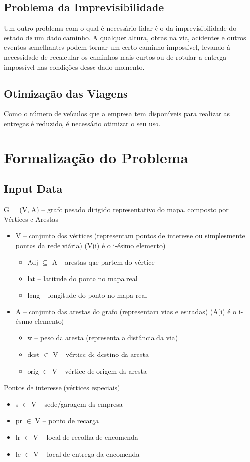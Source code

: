 \documentclass[12pt]{article}
\begin{document}
\subsection{Problema da Imprevisibilidade}
Um outro problema com o qual é necessário lidar é o da imprevisibilidade do estado de um dado caminho. A qualquer altura, obras na via, acidentes e outros eventos semelhantes podem tornar um certo caminho impossível, levando à necessidade de recalcular os caminhos mais curtos ou de rotular a entrega impossível nas condições desse dado momento.

\subsection{Otimização das Viagens}
Como o número de veículos que a empresa tem disponíveis para realizar as entregas é reduzido, é necessário otimizar o seu uso.

\newpage

\section{Formalização do Problema}

\subsection{Input Data}
G = (V, A) -- grafo pesado dirigido representativo do mapa, composto por Vértices e Arestas
\begin{itemize}
	\item V – conjunto dos vértices (representam \uline{pontos de interesse} ou simplesmente pontos da rede viária) (V(i) é o i-ésimo elemento)
\begin{itemize}
	\item Adj $ \subseteq $  A – arestas que partem do vértice
	\item lat – latitude do ponto no mapa real
	\item long – longitude do ponto no mapa real

\end{itemize}
	\item A – conjunto das arestas do grafo (representam vias e estradas) (A(i) é o i-ésimo elemento)
\begin{itemize}
	\item w – peso da aresta (representa a distância da via)
	\item dest $ \in $  V – vértice de destino da aresta
	\item orig $ \in $  V – vértice de origem da aresta
\end{itemize}
\end{itemize}
\uline{Pontos de interesse} (vértices especiais)
\begin{itemize}
	\item s $ \in $  V – sede/garagem da empresa
	\item pr $ \in $  V – ponto de recarga
	\item lr $ \in $  V – local de recolha de encomenda
	\item le $ \in $  V – local de entrega da encomenda
\end{itemize}
\end{document}
